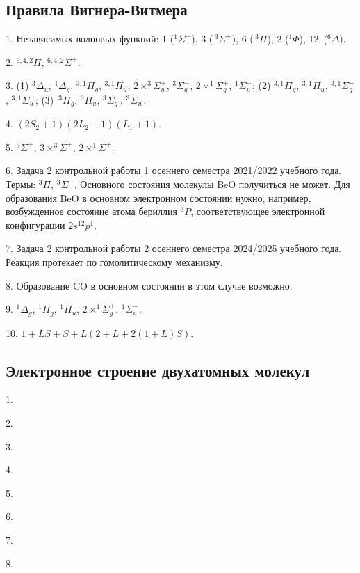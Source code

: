 \subsection{Правила Вигнера-Витмера}
1. Независимых волновых функций: 1 ($^1\Sigma^-$), 3 ($\,^3\Sigma^+$), 6 ($\,^3\Pi$), 2 ($^1\Phi$), 12~($^6\Delta$). \par
2.  $^{6,4,2}\Pi$,  $^{6,4,2}\Sigma^+$.\par
3. (1) $^3\Delta_u$, $^1\Delta_g$, $^{3,1}\Pi_g$, $^{3,1}\Pi_u$, $2 \times ^{3}\Sigma_u^+$, $^3\Sigma^-_g$, $2 \times ^{1}\Sigma_g^+$, $^{1}\Sigma_u^-$; (2) $^{3,1}\Pi_g$, $^{3,1}\Pi_u$, $^{3,1}\Sigma^-_g$, $^{3,1}\Sigma^-_u$; (3)~$^3\Pi_g$, $^3\Pi_u$, $^3\Sigma^-_g$, $^3\Sigma^-_u$.\par
4. $(2S_2+1)(2L_2+1)(L_1+1).$\par
5.  $^{5}\Sigma^+$, $3 \times ^{3}\Sigma^+$, $2 \times ^{1}\Sigma^+$.\par
6. Задача 2 контрольной работы 1 осеннего семестра 2021/2022 учебного года. Термы: $^3\Pi$, $^3\Sigma^-$. Основного состояния молекулы BeO получиться не может. Для образования BeO в основном электронном состоянии нужно, например, возбужденное состояние атома бериллия $^3P$, соответствующее электронной конфигурации $2s^12p^1$.\par
7. Задача 2 контрольной работы 2 осеннего семестра 2024/2025 учебного года. Реакция протекает по гомолитическому механизму.\par
8. Образование CO в основном состоянии в этом случае возможно.\par
9. $^1\Delta_g$, $^1\Pi_g$, $^1\Pi_u$, $2 \times ^1\Sigma^+_g$, $^1\Sigma^-_u$.\par
10. $1 + LS + S + L(2 + L + 2(1 + L)S)$.\par
\newpage

\subsection{Электронное строение двухатомных молекул}
1. \par
2. \par
3. \par
4. \par
5. \par
6. \par
7. \par
8. \par
\newpage

